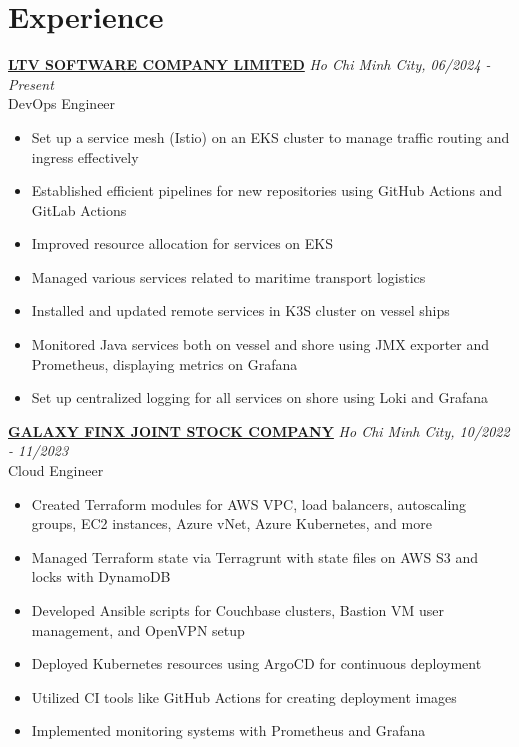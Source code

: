 \documentclass[a4paper,10pt]{article}
\begin{document}
\section*{Experience}
\noindent \textbf{\href{https://www.linkedin.com/company/ltvofficial/posts/?feedView=all}{LTV SOFTWARE COMPANY LIMITED}} \hfill \textit{Ho Chi Minh City, 06/2024 - Present}  \\
DevOps Engineer \\
\begin{itemize}
    \item Set up a service mesh (Istio) on an EKS cluster to manage traffic routing and ingress effectively
    \item Established efficient pipelines for new repositories using GitHub Actions and GitLab Actions
    \item Improved resource allocation for services on EKS
    \item Managed various services related to maritime transport logistics
    \item Installed and updated remote services in K3S cluster on vessel ships
    \item Monitored Java services both on vessel and shore using JMX exporter and Prometheus, displaying metrics on Grafana
    \item Set up centralized logging for all services on shore using Loki and Grafana
\end{itemize}

\vspace{10pt}
\noindent \textbf{\href{https://www.linkedin.com/company/galaxy-finx/posts/?feedView=all}{GALAXY FINX JOINT STOCK COMPANY}} \hfill \textit{Ho Chi Minh City, 10/2022 - 11/2023} \\
Cloud Engineer \\
\begin{itemize}
    \item Created Terraform modules for AWS VPC, load balancers, autoscaling groups, EC2 instances, Azure vNet, Azure Kubernetes, and more
    \item Managed Terraform state via Terragrunt with state files on AWS S3 and locks with DynamoDB
    \item Developed Ansible scripts for Couchbase clusters, Bastion VM user management, and OpenVPN setup
    \item Deployed Kubernetes resources using ArgoCD for continuous deployment
    \item Utilized CI tools like GitHub Actions for creating deployment images
    \item Implemented monitoring systems with Prometheus and Grafana
\end{itemize}
\end{document}
